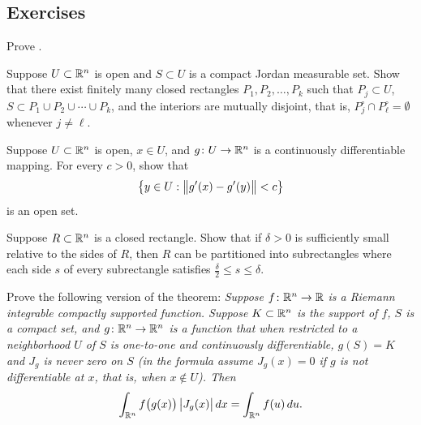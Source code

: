 \subsection{Exercises}

\begin{exercise}
Prove .
\end{exercise}

\begin{exercise} \label{mv:changeofvarcoverbyrects}
Suppose $U \subset {\mathbb{R}}^n$ is open
and $S \subset U$ is a compact Jordan measurable set.
Show that there exist finitely many closed rectangles
$P_1,P_2, \ldots, P_k$ such that $P_j \subset U$,
$S \subset P_1 \cup P_2 \cup \cdots \cup P_k$, and
the interiors are mutually disjoint, that is,
$P_j^\circ \cap P^\circ_\ell = \emptyset$ whenever $j \neq \ell$.
\end{exercise}

\begin{exercise} \label{mv:changeofvarWxopen}
Suppose $U \subset {\mathbb{R}}^n$ is open, $x \in U$,
and $g \colon U \to {\mathbb{R}}^n$ is a continuously differentiable mapping.
For every $c > 0$, show that
\begin{equation*}
\bigl\{ y \in U : \bigl\lVert {g'(x)-g'(y)} \bigr\rVert < c \bigr\}
\end{equation*}
is an open set.
\end{exercise}

\begin{exercise} \label{mv:changeofvarrectside}
Suppose $R \subset {\mathbb{R}}^n$ is a closed rectangle.
Show that if $\delta > 0$ is sufficiently small relative
to the sides of $R$, then $R$ can be partitioned
into subrectangles where each side $s$ of every subrectangle
satisfies $\frac{\delta}{2} \leq s \leq \delta$.
\end{exercise}

\begin{exercise}
Prove the following version of the theorem:
\emph{Suppose $f \colon {\mathbb{R}}^n \to {\mathbb{R}}$ is a Riemann integrable
compactly supported function.  Suppose $K \subset {\mathbb{R}}^n$
is the support of $f$, $S$ is a compact set,
and $g \colon {\mathbb{R}}^n \to {\mathbb{R}}^n$ is
a function that when restricted to a neighborhood $U$ of
$S$ is one-to-one and continuously differentiable,
$g(S) = K$ and $J_g$ is never zero on $S$ (in the formula 
assume $J_g(x) = 0$ if $g$ is not differentiable at $x$, that is, when $x \notin
U$).  Then}
\begin{equation*}
\int_{{\mathbb{R}}^n} f\bigl(g(x)\bigr) \, \bigl\lvert {J_g(x)} \bigr\rvert \, dx
=
\int_{{\mathbb{R}}^{n}} f(u) \, du .
\end{equation*}
\end{exercise}

